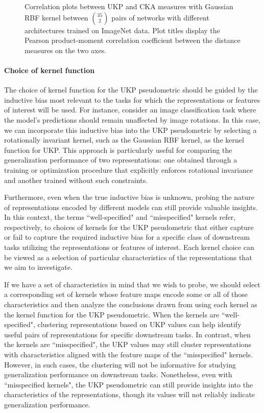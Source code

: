 \documentclass{article}
\theoremstyle{plain}
\newcommand{\metricstname}{UKP }
\begin{document}
\begin{figure}[h!]
    \caption{Correlation plots between UKP and CKA measures with Gaussian RBF kernel between $\binom{35}{2}$ pairs of networks with different architectures trained on  ImageNet data. Plot titles display the Pearson product-moment correlation coefficient between the distance measures on the two axes.}
    \label{ImageNet correlation plots UKP CKA}
\end{figure}

\paragraph{Choice of kernel function} The choice of kernel function for the \metricstname pseudometric should be guided by the inductive bias most relevant to the tasks for which the representations or features of interest will be used. For instance, consider an image classification task where the model's predictions should remain unaffected by image rotations. In this case, we can incorporate this inductive bias into the \metricstname pseudometric by selecting a rotationally invariant kernel, such as the Gaussian RBF kernel, as the kernel function for UKP. This approach is particularly useful for comparing the generalization performance of two representations: one obtained through a training or optimization procedure that explicitly enforces rotational invariance and another trained without such constraints.

Furthermore, even when the true inductive bias is unknown, probing the nature of representations encoded by different models can still provide valuable insights. In this context, the terms ``well-specified" and ``misspecified" kernels refer, respectively, to choices of kernels for the UKP pseudometric that either capture or fail to capture the required inductive bias for a specific class of downstream tasks utilizing the representations or features of interest. Each kernel choice can be viewed as a selection of particular characteristics of the representations that we aim to investigate.

If we have a set of characteristics in mind that we wish to probe, we should select a corresponding set of kernels whose feature maps encode some or all of those characteristics and then analyze the conclusions drawn from using each kernel as the kernel function for the \metricstname pseudometric. When the kernels are ``well-specified", clustering representations based on \metricstname values can help identify useful pairs of representations for specific downstream tasks. In contrast, when the kernels are ``misspecified", the \metricstname values may still cluster representations with characteristics aligned with the feature maps of the ``misspecified" kernels. However, in such cases, the clustering will not be informative for studying generalization performance on downstream tasks. Nonetheless, even with ``misspecified kernels", the \metricstname pseudometric can still provide insights into the characteristics of the representations, though its values will not reliably indicate generalization performance.
\end{document}
